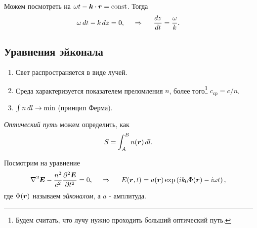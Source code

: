 Можем посмотреть на $\omega t - \mbox{\boldmath $k$} \cdot \mbox{\boldmath $r$} = \text{const}$. Тогда
\begin{equation*}
    \omega \, d t - k \, d z = 0,
    \hspace{0.5cm} \Rightarrow \hspace{0.5cm}
    \frac{dz}{dt} = \frac{\omega}{k}.
\end{equation*}


\subsection{Уравнения эйконала}

\begin{enumerate}
    \item Свет распространяется в виде лучей.
    \item Среда характеризуется показателем преломления $n$, более того\footnote{
        Будем считать, что лучу нужно проходить больший оптический путь.
    }  $c_{\text{ср}} = c / n$.
    \item $\int n \, d l \to \min$ (принцип Ферма).
\end{enumerate}

\begin{to_def}
    \textit{Оптический путь} можем определить, как
    \begin{equation*}
        S = \int_A^B n(\mbox{\boldmath $r$}) \, d l.
    \end{equation*}
\end{to_def}


Посмотрим на уравнение
\begin{equation*}
    \nabla^2 \mbox{\boldmath $E$} - \frac{n^2}{c^2} \frac{\partial^2 \mbox{\boldmath $E$}}{\partial t^2} = 0,
    \hspace{0.5cm} \Rightarrow \hspace{0.5cm}
    {E} (\mbox{\boldmath $r$}, t) = a(\mbox{\boldmath $r$}) \exp\left(
        i k_0 \Phi(\mbox{\boldmath $r$}) - i \omega t
    \right),
\end{equation*}
где $\Phi(\mbox{\boldmath $r$})$ называем \textit{эйконалом}, а $a$ - амплитуда.

